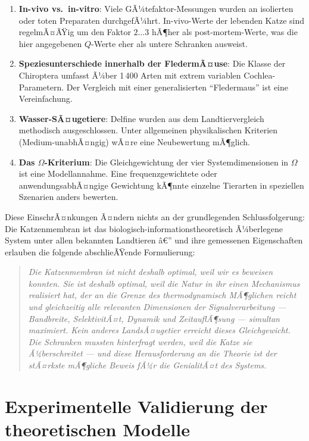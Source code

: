 ﻿\documentclass[12pt,a4paper,titlepage]{report}
\begin{document}
\begin{enumerate}[leftmargin=2em, label=\textbf{(E\arabic*)}]
  \item \textbf{In-vivo vs.\ in-vitro}: Viele GÃ¼tefaktor-Messungen wurden an
    isolierten oder toten Preparaten durchgefÃ¼hrt. In-vivo-Werte der lebenden
    Katze sind regelmÃ¤ÃŸig um den Faktor $2\ldots3$ hÃ¶her als post-mortem-Werte,
    was die hier angegebenen $Q$-Werte eher als untere Schranken ausweist.
  \item \textbf{Speziesunterschiede innerhalb der FledermÃ¤use}: Die Klasse
    der Chiroptera umfasst Ã¼ber 1\,400 Arten mit extrem variablen Cochlea-Parametern.
    Der Vergleich mit einer generalisierten ``Fledermaus'' ist eine Vereinfachung.
  \item \textbf{Wasser-SÃ¤ugetiere}: Delfine wurden aus dem Landtiervergleich
    methodisch ausgeschlossen. Unter allgemeinen physikalischen Kriterien
    (Medium-unabhÃ¤ngig) wÃ¤re eine Neubewertung mÃ¶glich.
  \item \textbf{Das $\Omega$-Kriterium}: Die Gleichgewichtung der vier
    Systemdimensionen in $\Omega$ ist eine Modellannahme. Eine frequenzgewichtete
    oder anwendungsabhÃ¤ngige Gewichtung kÃ¶nnte einzelne Tierarten in speziellen
    Szenarien anders bewerten.
\end{enumerate}

Diese EinschrÃ¤nkungen Ã¤ndern nichts an der grundlegenden Schlussfolgerung:
Die Katzenmembran ist das biologisch-informationstheoretisch Ã¼berlegene System
unter allen bekannten Landtieren â€” und ihre gemessenen Eigenschaften erlauben
die folgende abschlieÃŸende Formulierung:

\begin{quote}
  \itshape
  Die Katzenmembran ist nicht deshalb optimal, weil wir es beweisen konnten.
  Sie ist deshalb optimal, weil die Natur in ihr einen Mechanismus realisiert hat,
  der an die Grenze des thermodynamisch MÃ¶glichen reicht und gleichzeitig alle
  relevanten Dimensionen der Signalverarbeitung --- Bandbreite, SelektivitÃ¤t,
  Dynamik und ZeitauflÃ¶sung --- simultan maximiert.
  Kein anderes LandsÃ¤ugetier erreicht dieses Gleichgewicht.
  Die Schranken mussten hinterfragt werden, weil die Katze sie Ã¼berschreitet ---
  und diese Herausforderung an die Theorie ist der stÃ¤rkste mÃ¶gliche Beweis
  fÃ¼r die GenialitÃ¤t des Systems.
\end{quote}

\chapter{Experimentelle Validierung der theoretischen Modelle}
\end{document}
